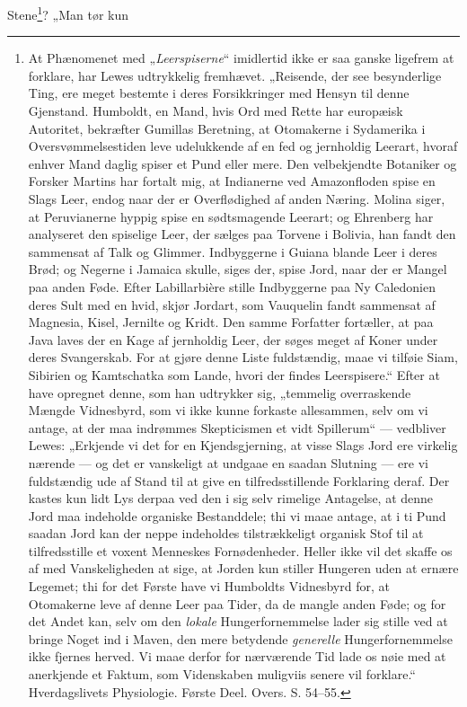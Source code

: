 \documentclass[12pt,a4paper]{book}
\begin{document}
Stene\footnote{At Phænomenet med „\emph{Leerspiserne}“ imidlertid ikke er
saa ganske ligefrem at forklare, har Lewes udtrykkelig fremhævet.
„Reisende, der see besynderlige Ting, ere meget bestemte i deres
Forsikkringer med Hensyn til denne Gjenstand. Humboldt, en Mand,
hvis Ord med Rette har europæisk Autoritet, bekræfter Gumillas
Beretning, at Otomakerne i Sydamerika i Oversvømmelsestiden leve
udelukkende af en fed og jernholdig Leerart, hvoraf enhver Mand
daglig spiser et Pund eller mere. Den velbekjendte Botaniker og
Forsker Martins har fortalt mig, at Indianerne ved Amazonfloden
spise en Slags Leer, endog naar der er Overflødighed af anden
Næring. Molina siger, at Peruvianerne hyppig spise en sødtsmagende
Leerart; og Ehrenberg har analyseret den spiselige Leer, der sælges
paa Torvene i Bolivia, han fandt den sammensat af Talk og Glimmer.
Indbyggerne i Guiana blande Leer i deres Brød; og Negerne i Jamaica
skulle, siges der, spise Jord, naar der er Mangel paa anden Føde.
Efter Labillarbière stille Indbyggerne paa Ny Caledonien deres Sult
med en hvid, skjør Jordart, som Vauquelin fandt sammensat af
Magnesia, Kisel, Jernilte og Kridt. Den samme Forfatter fortæller, at
paa Java laves der en Kage af jernholdig Leer, der søges meget af
Koner under deres Svangerskab. For at gjøre denne Liste
fuldstændig, maae vi tilføie Siam, Sibirien og Kamtschatka som
Lande, hvori der findes Leerspisere.“ Efter at have opregnet denne,
som han udtrykker sig, „temmelig overraskende Mængde Vidnesbyrd, som
vi ikke kunne forkaste allesammen, selv om vi antage, at der maa
indrømmes Skepticismen et vidt Spillerum“ --- vedbliver Lewes:
„Erkjende vi det for en Kjendsgjerning, at visse Slags Jord ere
virkelig nærende --- og det er vanskeligt at undgaae en saadan
Slutning --- ere vi fuldstændig ude af Stand til at give en
tilfredsstillende Forklaring deraf. Der kastes kun lidt Lys derpaa
ved den i sig selv rimelige Antagelse, at denne Jord maa indeholde
organiske Bestanddele; thi vi maae antage, at i ti Pund saadan Jord
kan der neppe indeholdes tilstrækkeligt organisk Stof til at
tilfredsstille et voxent Menneskes Fornødenheder. Heller ikke vil
det skaffe os af med Vanskeligheden at sige, at Jorden kun stiller
Hungeren uden at ernære Legemet; thi for det Første have vi
Humboldts Vidnesbyrd for, at Otomakerne leve af denne Leer paa
Tider, da de mangle anden Føde; og for det Andet kan, selv om den
\emph{lokale} Hungerfornemmelse lader sig stille ved at bringe Noget ind i
Maven, den mere betydende \emph{generelle} Hungerfornemmelse ikke
fjernes herved. Vi maae derfor for nærværende Tid lade os nøie med
at anerkjende et Faktum, som Videnskaben muligviis senere vil
forklare.“ Hverdagslivets Physiologie. Første Deel. Overs. S.
54--55.}? „Man tør kun
\end{document}
